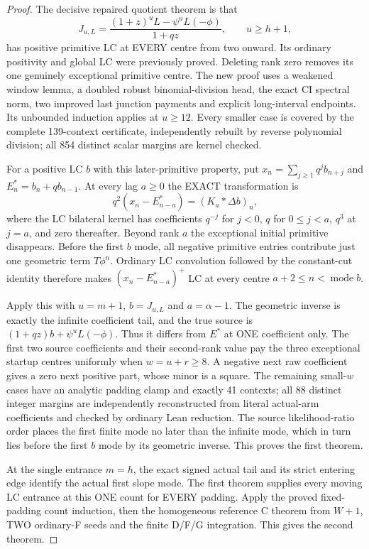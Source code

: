 \begin{proof}
The decisive repaired quotient theorem is that
\[
 J_{u,L}=\frac{(1+z)^uL-\psi^uL(-\phi)}{1+qz},
             \qquad u\ge h+1,
\]
has positive primitive LC at EVERY centre from two onward. Its
ordinary positivity and global LC were previously proved. Deleting
rank zero removes its one genuinely exceptional primitive centre.
The new proof uses a weakened window lemma, a doubled robust
binomial-division head, the exact CI spectral norm, two improved last
junction payments and explicit long-interval endpoints. Its unbounded
induction applies at $u\ge12$. Every smaller case is covered by the
complete 139-context certificate, independently rebuilt by reverse
polynomial division; all 854 distinct scalar margins are kernel checked.

For a positive LC $b$ with this later-primitive property, put
$x_n=\sum_{j\ge1}q^jb_{n+j}$ and $E^*_n=b_n+qb_{n-1}$.
At every lag $a\ge0$ the EXACT transformation is
\[
 q^2(x_n-E^*_{n-a})=(K_a*\Delta b)_n,
\]
where the LC bilateral kernel has coefficients $q^{-j}$ for $j<0$,
$q$ for $0\le j<a$, $q^3$ at $j=a$, and zero thereafter.
Beyond rank $a$ the exceptional initial primitive disappears. Before
the first $b$ mode, all negative primitive entries contribute just
one geometric term $T\phi^n$. Ordinary LC convolution followed by
the constant-cut identity therefore makes $(x_n-E^*_{n-a})^+$ LC at
every centre $a+2\le n<\operatorname{mode}b$.

Apply this with $u=m+1$, $b=J_{u,L}$ and $a=\alpha-1$.
The geometric inverse is exactly the infinite coefficient tail,
and the true source is $(1+qz)b+\psi^uL(-\phi)$. Thus it differs
from $E^*$ at ONE coefficient only. The first two source coefficients
and their second-rank value pay the three exceptional startup centres
uniformly when $w=u+r\ge8$. A negative next raw coefficient gives
a zero next positive part, whose minor is a square. The remaining
small-$w$ cases have an analytic padding clamp and exactly 41 contexts;
all 88 distinct integer margins are independently reconstructed from
literal actual-arm coefficients and checked by ordinary Lean reduction.
The source likelihood-ratio order places the first finite mode no
later than the infinite mode, which in turn lies before the first
$b$ mode by its geometric inverse. This proves the first theorem.

At the single entrance $m=h$, the exact signed actual tail and its
strict entering edge identify the actual first slope mode. The first
theorem supplies every moving LC entrance at this ONE count for
EVERY padding. Apply the proved fixed-padding count induction, then
the homogeneous reference C theorem from $W+1$, TWO ordinary-F seeds
and the finite D/F/G integration. This gives the second theorem.
\end{proof}

